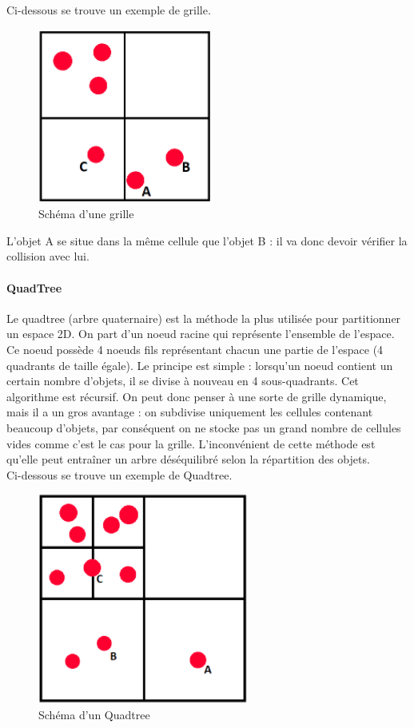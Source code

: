 \documentclass{report}
\begin{document}
Ci-dessous se trouve un exemple de grille.

\begin{figure}[H]
\centering
\includegraphics[scale=0.6]{grid.PNG}
\caption{Schéma d'une grille}
\end{figure}

L’objet A se situe dans la même cellule que l’objet B : il va donc devoir vérifier la collision avec lui.

\paragraph{QuadTree}

Le quadtree (arbre quaternaire) est la méthode la plus utilisée pour partitionner un espace 2D. On part d’un noeud racine qui représente l’ensemble de l’espace. Ce noeud possède 4 noeuds fils représentant chacun une partie de l’espace (4 quadrants de taille égale). Le principe est simple : lorsqu’un noeud contient un certain nombre d’objets, il se divise à nouveau en 4 sous-quadrants. Cet algorithme est récursif. On peut donc penser à une sorte de grille dynamique, mais il a un gros avantage : on subdivise uniquement les cellules contenant beaucoup d’objets, par conséquent on ne stocke pas un grand nombre de cellules vides comme c’est le cas pour la grille. L’inconvénient de cette méthode est qu’elle peut entraîner un arbre déséquilibré selon la répartition des objets. \\

Ci-dessous se trouve un exemple de Quadtree.

\begin{figure}[H]
\centering
\includegraphics[scale=0.6]{quadtree.PNG}
\caption{Schéma d'un Quadtree}
\end{figure}
\end{document}
